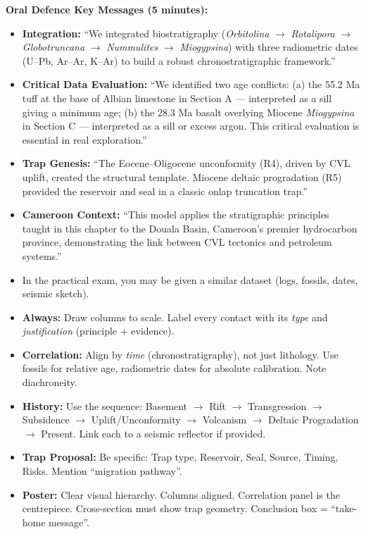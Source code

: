 \documentclass[11pt]{article}
\begin{document}
\begin{exoresolu}
\textbf{Oral Defence Key Messages (5 minutes):}
\begin{itemize}
    \item \textbf{Integration:} ``We integrated biostratigraphy (\emph{Orbitolina} $\rightarrow$ \emph{Rotalipora} $\rightarrow$ \emph{Globotruncana} $\rightarrow$ \emph{Nummulites} $\rightarrow$ \emph{Miogypsina}) with three radiometric dates (U--Pb, Ar--Ar, K--Ar) to build a robust chronostratigraphic framework.''
    \item \textbf{Critical Data Evaluation:} ``We identified two age conflicts: (a) the 55.2 Ma tuff at the base of Albian limestone in Section A --- interpreted as a sill giving a minimum age; (b) the 28.3 Ma basalt overlying Miocene \emph{Miogypsina} in Section C --- interpreted as a sill or excess argon. This critical evaluation is essential in real exploration.''
    \item \textbf{Trap Genesis:} ``The Eocene--Oligocene unconformity (R4), driven by CVL uplift, created the structural template. Miocene deltaic progradation (R5) provided the reservoir and seal in a classic onlap truncation trap.''
    \item \textbf{Cameroon Context:} ``This model applies the stratigraphic principles taught in this chapter to the Douala Basin, Cameroon's premier hydrocarbon province, demonstrating the link between CVL tectonics and petroleum systems.''
\end{itemize}

\begin{aretenir}
\begin{itemize}
\item In the practical exam, you may be given a similar dataset (logs, fossils, dates, seismic sketch).
\item \textbf{Always:} Draw columns to scale. Label every contact with its \emph{type} and \emph{justification} (principle + evidence).
\item \textbf{Correlation:} Align by \emph{time} (chronostratigraphy), not just lithology. Use fossils for relative age, radiometric dates for absolute calibration. Note diachroneity.
\item \textbf{History:} Use the sequence: Basement $\rightarrow$ Rift $\rightarrow$ Transgression $\rightarrow$ Subsidence $\rightarrow$ Uplift/Unconformity $\rightarrow$ Volcanism $\rightarrow$ Deltaic Progradation $\rightarrow$ Present. Link each to a seismic reflector if provided.
\item \textbf{Trap Proposal:} Be specific: Trap type, Reservoir, Seal, Source, Timing, Risks. Mention ``migration pathway''.
\item \textbf{Poster:} Clear visual hierarchy. Columns aligned. Correlation panel is the centrepiece. Cross-section must show trap geometry. Conclusion box = ``take-home message''.
\end{itemize}
\end{aretenir}
\end{exoresolu}
\end{document}
